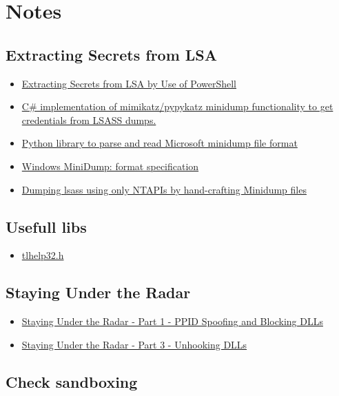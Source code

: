 \section{Notes}
\subsection{Extracting Secrets from LSA }
\begin{itemize}
    \item \href{https://blog.syss.com/posts/powershell-lsa-parsing/}{Extracting Secrets from LSA by Use of PowerShell}
    \item  \href{https://github.com/cube0x0/MiniDump}{C\# implementation of mimikatz/pypykatz minidump functionality to get credentials from LSASS dumps.}
    \item \href{https://github.com/skelsec/minidump}{Python library to parse and read Microsoft minidump file format}
    \item \href{https://formats.kaitai.io/windows_minidump/}{Windows MiniDump: format specification }
    \item \href{https://ricardojoserf.github.io/nativedump/}{Dumping lsass using only NTAPIs by hand-crafting Minidump files}
\end{itemize}
\subsection{Usefull libs}
\begin{itemize}
    \item \href{https://learn.microsoft.com/fr-fr/windows/win32/api/tlhelp32/}{tlhelp32.h}
\end{itemize}

\subsection{Staying Under the Radar}

\begin{itemize}
    \item \href{https://crypt0ace.github.io/posts/Staying-under-the-Radar/}{Staying Under the Radar - Part 1 - PPID Spoofing and Blocking DLLs}
    \item \href{https://crypt0ace.github.io/posts/Staying-under-the-Radar-Part-3/}{Staying Under the Radar - Part 3 - Unhooking DLLs}
\end{itemize}

\subsection{Check sandboxing}

